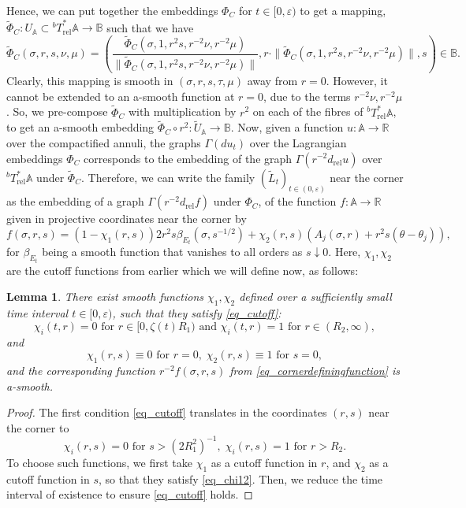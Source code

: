 \documentclass[10pt, a4paper]{article}
\theoremstyle{plain}%
\newtheorem{lem}[theorem]{Lemma}
\theoremstyle{definition}
\numberwithin{figure}{section}
\numberwithin{equation}{section}
\newcommand{\bR}{\mathbb{R}}
\newcommand{\bA}{\mathbb{A}}
\newcommand{\bB}{\mathbb{B}}
\newcommand{\rt}{\rightarrow}
\newcommand{\ep}{\varepsilon}
\newcommand{\tPhi}{\widetilde{\Phi}}
\newcommand{\tL}{\widetilde{L}}
\newcommand{\rel}{\mathrm{rel}}
\begin{document}
\begin{itemize}
    Hence, we can put together the embeddings $\Phi_{C}$ for $t\in[0,\ep)$ to get a mapping, $\widetilde{\Phi}_{C} : U_\bA \subset {^bT}^*_\mathrm{rel}\bA\rt \bB$ such that we have
    \begin{equation}\label{eq_embeddingB}
    \tPhi_C(\sigma,r,s,\nu,\mu) = \left(\frac{\tPhi_C(\sigma,1,r^2s,r^{-2}\nu,r^{-2}\mu)}{\|\tPhi_C(\sigma,1,r^2s,r^{-2}\nu,r^{-2}\mu)\|}, r\cdot \|\tPhi_C(\sigma,1,r^2s,r^{-2}\nu,r^{-2}\mu)\|,s\right) \in \bB.
    \end{equation}
   	Clearly, this mapping is smooth in $(\sigma,r,s,\tau,\mu)$ away from $r=0$. However, it cannot be extended to an a-smooth function at $r=0$, due to the terms $r^{-2}\nu,r^{-2}\mu$. So, we pre-compose $\tPhi_C$ with multiplication by $r^{2}$ on each of the fibres of $^bT^*_\mathrm{rel}\bA$, to get an a-smooth embedding $\tPhi_C\circ r^2:\tilde{U}_\bA\rt\bB$. Now, given a function $u:\bA \rt \bR$ over the compactified annuli, the graphs $\Gamma(d u_t)$ over the Lagrangian embeddings $\Phi_C$ corresponds to the embedding of the graph $\Gamma(r^{-2}d_\mathrm{rel}u)$ over $^bT^*_\rel\bA$ under $\widetilde{\Phi}_C$. Therefore, we can write the family $(\tL_t)_{t\in(0,\ep)}$ near the corner as the embedding of a graph $\Gamma(r^{-2}d_\rel f)$ under $\Phi_C$, of the function $f : \mathbb{A}\rightarrow \mathbb{R}$ given in projective coordinates near the corner by \begin{equation}\label{eq_cornerdefiningfunction}
	f(\sigma, r, s) = (1-\chi_1(r,s))2r^2s\beta_{E_t}(\sigma,s^{-1/2})+\chi_2(r,s)(A_j(\sigma,r)+r^2s(\theta-\theta_j)),
	\end{equation}
	for $\beta_{E_t}$ being a smooth function that vanishes to all orders as $s\downarrow 0$. Here, $\chi_1,\chi_2$ are the cutoff functions from earlier which we will define now, as follows:
	\begin{lem}\label{lem_cutofffunctions}
		There exist smooth functions $\chi_1,\chi_2$ defined over a sufficiently small time interval $t\in [0,\ep)$, such that they satisfy \eqref{eq_cutoff}:
		 \[
		\chi_i(t,r) = 0 \textrm{ for } r\in[0,\zeta(t)R_1) \textrm{ and } \chi_i(t,r)=1 \textrm{ for }r\in (R_2,\infty),
		\] and
		\begin{equation}\label{eq_chi12}
			\chi_1(r,s) \equiv 0 \textrm{ for } r=0,\; \chi_2(r,s)\equiv 1 \textrm{ for } s=0,
		\end{equation}
		 and the corresponding function $r^{-2}f(\sigma,r,s)$ from \eqref{eq_cornerdefiningfunction} is a-smooth.
	\end{lem}
	\begin{proof}
		The first condition \eqref{eq_cutoff} translates in the coordinates $(r,s)$ near the corner to \[
		\chi_i(r,s)=0 \textrm{ for } s> (2R_1^2)^{-1}, \; \chi_i(r,s) =1 \textrm{ for } r >R_2.
		\]
		To choose such functions, we first take $\chi_1$ as a cutoff function in $r$, and $\chi_2$ as a cutoff function in $s$, so that they satisfy \eqref{eq_chi12}. Then, we reduce the time interval of existence to ensure \eqref{eq_cutoff} holds.
	\end{proof}
	

\end{itemize}
\end{document}
